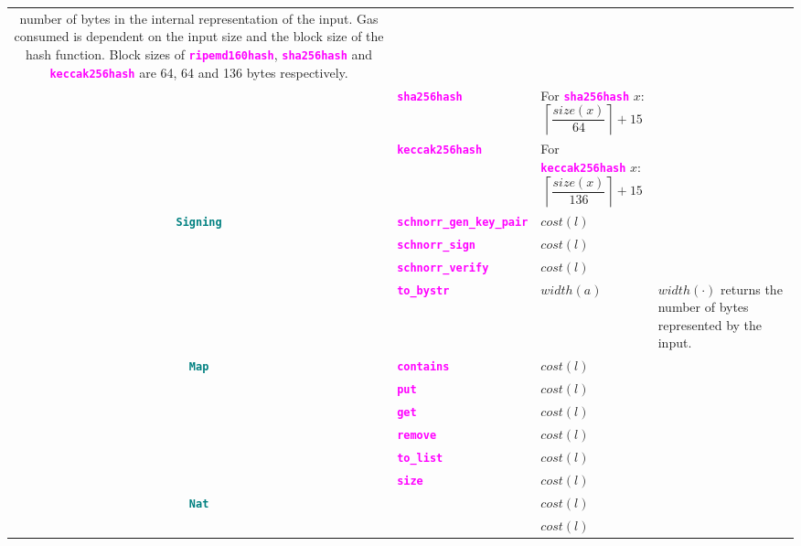 \documentclass[9pt]{article}
\begin{document}
\begin{table}[!hbt]
\begin{tabular}{|c|p{4.1cm}|p{4cm}|p{4cm}|}
{		 number  of bytes in the internal representation of the input. Gas
		 consumed is
		 dependent on the input size and the block size of the hash function.
		 Block sizes of  \textbf{\texttt{\textcolor{magenta}{ripemd160hash}}},
		 \textbf{\texttt{\textcolor{magenta}{sha256hash}}} and
		 \textbf{\texttt{\textcolor{magenta}{keccak256hash}}} are 64, 64 and
		 136 bytes respectively.}   \\
		\cline{2-3}
		 & \textbf{\texttt{\textcolor{magenta}{sha256hash}}} & For
		 \textbf{\texttt{\textcolor{magenta}{sha256hash}}} $x$:  $$\left\lceil
		 \frac{size(x)}{64}\right \rceil + 15 $$  & \\ \cline{2-3}
		 & \textbf{\texttt{\textcolor{magenta}{keccak256hash}}} &
		  For
		 \textbf{\texttt{\textcolor{magenta}{keccak256hash}}} $x$:  $$\left\lceil
		 \frac{size(x)}{136}\right \rceil + 15 $$ 
		   & \\ \hline
		 \hline
		\multirow{4}{*}{\textbf{\texttt{\textcolor{teal}{Signing}}}} &
		\textbf{\texttt{\textcolor{magenta}{schnorr\_gen\_key\_pair}}} & $cost(l)$  & \\
		\cline{2-4}
		 & \textbf{\texttt{\textcolor{magenta}{schnorr\_sign}}} & $cost(l)$  & \\ \cline{2-4}
		 & \textbf{\texttt{\textcolor{magenta}{schnorr\_verify}}} & $cost(l)$  & \\
		 \cline{2-4}
		 & \textbf{\texttt{\textcolor{magenta}{to\_bystr}}} & $width(a)$  & $width(\cdot)$
		 returns
		 the number of
		 bytes represented
		 by the input.\\ \hline
		 \hline
		\multirow{6}{*}{\textbf{\texttt{\textcolor{teal}{Map}}}} &
		\textbf{\texttt{\textcolor{magenta}{contains}}} & $cost(l)$  & \\
		\cline{2-4}
		 & \textbf{\texttt{\textcolor{magenta}{put}}} & $cost(l)$  & \\ \cline{2-4}
		 & \textbf{\texttt{\textcolor{magenta}{get}}} & $cost(l)$  & \\ \cline{2-4}
		 & \textbf{\texttt{\textcolor{magenta}{remove}}} & $cost(l)$  & \\ \cline{2-4}
		 & \textbf{\texttt{\textcolor{magenta}{to\_list}}} & $cost(l)$  & \\ \cline{2-4}
		 & \textbf{\texttt{\textcolor{magenta}{size}}} & $cost(l)$  & \\ \hline \hline
		\multirow{4}{*}{\textbf{\texttt{\textcolor{teal}{Nat}}}} &
		\texttt{\textcolor{magenta}{}} & $cost(l)$  & \\
		\cline{2-4}
		 & \texttt{\textcolor{magenta}{}} & $cost(l)$  & \\ \cline{2-4}

\end{tabular}
\end{table}
\end{document}
